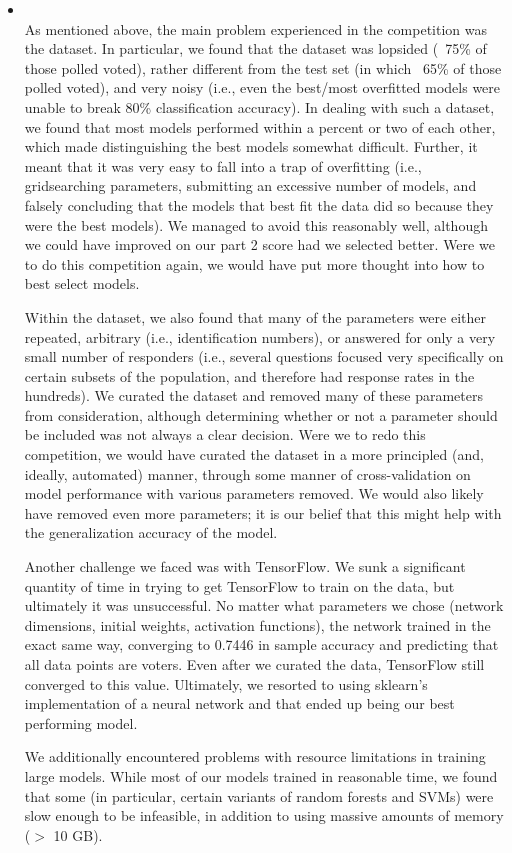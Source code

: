 \begin{itemize}
    \item {} \\
    As mentioned above, the main problem experienced in the competition was the dataset. In particular, we found that the dataset was lopsided (~75\% of those polled voted), rather different from the test set (in which ~65\% of those polled voted), and very noisy (i.e., even the best/most overfitted models were unable to break 80\% classification accuracy). In dealing with such a dataset, we found that most models performed within a percent or two of each other, which made distinguishing the best models somewhat difficult. Further, it meant that it was very easy to fall into a trap of overfitting (i.e., gridsearching parameters, submitting an excessive number of models, and falsely concluding that the models that best fit the data did so because they were the best models). We managed to avoid this reasonably well, although we could have improved on our part 2 score had we selected better. Were we to do this competition again, we would have put more thought into how to best select models.

    \hspace{8mm} Within the dataset, we also found that many of the parameters were either repeated, arbitrary (i.e., identification numbers), or answered for only a very small number of responders (i.e., several questions focused very specifically on certain subsets of the population, and therefore had response rates in the hundreds). We curated the dataset and removed many of these parameters from consideration, although determining whether or not a parameter should be included was not always a clear decision. Were we to redo this competition, we would have curated the dataset in a more principled (and, ideally, automated) manner, through some manner of cross-validation on model performance with various parameters removed. We would also likely have removed even more parameters; it is our belief that this might help with the generalization accuracy of the model.

    \hspace{8mm} Another challenge we faced was with TensorFlow. We sunk a significant quantity of time in trying to get TensorFlow to train on the data, but ultimately it was unsuccessful. No matter what parameters we chose (network dimensions, initial weights, activation functions), the network trained in the exact same way, converging to 0.7446 in sample accuracy and predicting that all data points are voters. Even after we curated the data, TensorFlow still converged to this value. Ultimately, we resorted to using sklearn's implementation of a neural network and that ended up being our best performing model.

    \hspace{8mm} We additionally encountered problems with resource limitations in training large models. While most of our models trained in reasonable time, we found that some (in particular, certain variants of random forests and SVMs) were slow enough to be infeasible, in addition to using massive amounts of memory ($> $ 10 GB).

\end{itemize}

